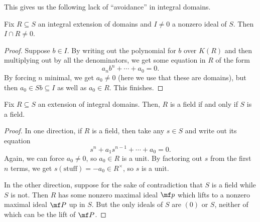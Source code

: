 This gives us the following lack of ``avoidance'' in integral domains.
\begin{prop}
	Fix $R\subseteq S$ an integral extension of domains and $I\ne0$ a nonzero ideal of $S$. Then $I\cap R\ne0$.
\end{prop}
\begin{proof}
	Suppose $b\in I$. By writing out the polynomial for $b$ over $K(R)$ and then multiplying out by all the denominators, we get some equation in $R$ of the form
	\[a_nb^n+\cdots+a_0=0.\]
	By forcing $n$ minimal, we get $a_0\ne0$ (here we use that these are domains), but then $a_0\in Sb\subseteq I$ as well as $a_0\in R$. This finishes.
\end{proof}
\begin{proposition}
	Fix $R\subseteq S$ an extension of integral domains. Then, $R$ is a field if and only if $S$ is a field.
\end{proposition}
\begin{proof}
	In one direction, if $R$ is a field, then take any $s\in S$ and write out its equation
	\[s^n+a_1s^{n-1}+\cdots+a_0=0.\]
	Again, we can force $a_0\ne0$, so $a_0\in R$ is a unit. By factoring out $s$ from the first $n$ terms, we get $s(\text{stuff})=-a_0\in R^\times$, so $s$ is a unit.

	In the other direction, suppose for the sake of contradiction that $S$ is a field while $S$ is not. Then $R$ has some nonzero maximal ideal $\mf p$ which lifts to a nonzero maximal ideal $\mf P$ up in $S$. But the only ideals of $S$ are $(0)$ or $S$, neither of which can be the lift of $\mf P$.
\end{proof}